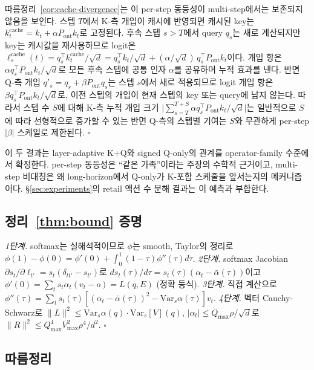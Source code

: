 따름정리~\ref{cor:cache-divergence}는 이 per-step 동등성이 multi-step에서는 보존되지 않음을 보인다. 스텝 $T$에서 K-측 개입이 캐시에 반영되면 캐시된 key는 $k^{\text{cache}}_t = k_t + \alpha P_{\mathrm{ont}} k_t$로 고정된다. 후속 스텝 $s > T$에서 query $q_s$는 새로 계산되지만 key는 캐시값을 재사용하므로 logit은 $\ell_s^{\text{cache}}(t) = q_s^\top k^{\text{cache}}_t/\sqrt d = q_s^\top k_t/\sqrt d + (\alpha/\sqrt d)\, q_s^\top P_{\mathrm{ont}} k_t$이다. 개입 항은 $\alpha q_s^\top P_{\mathrm{ont}} k_t / \sqrt d$로 모든 후속 스텝에 공통 인자 $\alpha$를 공유하며 누적 효과를 낸다. 반면 Q-측 개입 $q'_s = q_s + \beta P_{\mathrm{ont}} q_s$는 스텝 $s$에서 새로 적용되므로 logit 개입 항은 $\beta q_s^\top P_{\mathrm{ont}} k_t/\sqrt d$로, 이전 스텝의 개입이 현재 스텝의 key 또는 query에 남지 않는다. 따라서 스텝 수 $S$에 대해 K-측 누적 개입 크기 $\lvert\sum_{s=T}^{T+S} \alpha q_s^\top P_{\mathrm{ont}} k_t/\sqrt d\rvert$는 일반적으로 $S$에 따라 선형적으로 증가할 수 있는 반면 Q-측의 스텝별 기여는 $S$와 무관하게 per-step $|\beta|$ 스케일로 제한된다. $\square$

이 두 결과는 layer-adaptive K+Q와 signed Q-only의 관계를 operator-family 수준에서 확정한다. per-step 동등성은 ``같은 가족''이라는 주장의 수학적 근거이고, multi-step 비대칭은 왜 long-horizon에서 Q-only가 K-포함 스케줄을 앞서는지의 메커니즘이다. \S\ref{sec:experiments}의 retail 액션 수 분해 결과는 이 예측과 부합한다.

\subsection{정리~\ref{thm:bound} 증명}\label{app:proof:bound}

\emph{1단계.} softmax는 실해석적이므로 $\phi$는 smooth, Taylor의 정리로 $\phi(1)-\phi(0) = \phi'(0) + \int_0^1(1-\tau)\phi''(\tau) d\tau$.
\emph{2단계.} softmax Jacobian $\partial s_t/\partial\ell_{t'} = s_t(\delta_{tt'}-s_{t'})$로 $ds_t(\tau)/d\tau = s_t(\tau)(\alpha_t - \bar\alpha(\tau))$이고 $\phi'(0) = \sum_t s_t\alpha_t(v_t-o) = L(q,E)$ (정확 등식).
\emph{3단계.} 직접 계산으로 $\phi''(\tau) = \sum_t s_t(\tau)[(\alpha_t-\bar\alpha(\tau))^2 - \mathrm{Var}_s\alpha(\tau)] v_t$.
\emph{4단계.} 벡터 Cauchy-Schwarz로 $\|L\|^2 \le \mathrm{Var}_s\alpha(q)\cdot\mathrm{Var}_s[V](q)$, $|\alpha_t|\le Q_{\max}\rho/\sqrt d$로 $\|R\|^2 \le Q_{\max}^4 V_{\max}^2\rho^4/d^2$. $\square$

\subsection{따름정리}\label{app:corollaries}

